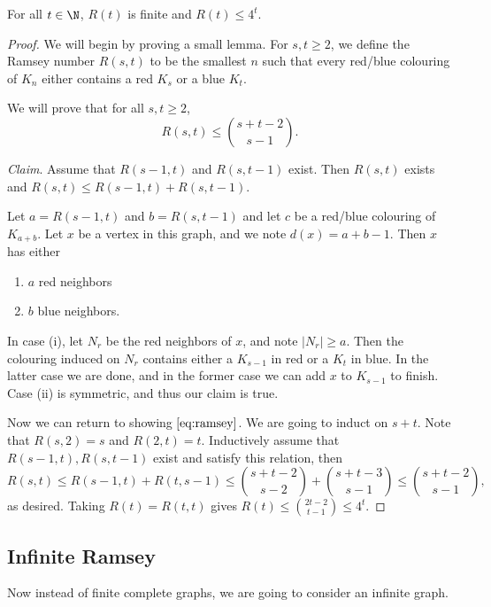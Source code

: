\documentclass[a4paper]{scrartcl}
\begin{document}
\begin{theorem}
	For all $t \in \N$, $R(t)$ is finite and $R(t) \leq 4^t$.
\end{theorem}
\begin{proof}
	We will begin by proving a small lemma. For $s, t \geq 2$, we define the Ramsey number $R(s, t)$ to be the smallest $n$ such that every red/blue colouring of $K_n$ either contains a red $K_s$ or a blue $K_t$.

	We will prove that for all $s, t \geq 2$,
	\begin{equation}\label{eq:ramsey}
		R(s, t) \leq \binom{s + t - 2}{s - 1}.\tag{$\dagger$}
	\end{equation}

	\emph{Claim}. Assume that $R(s - 1, t)$ and $R(s, t - 1)$ exist. Then $R(s, t)$ exists and $R(s, t) \leq R(s-1, t) + R(s, t - 1)$.

	Let $a = R(s - 1, t)$ and $b = R(s, t - 1)$ and let $c$ be a red/blue colouring of $K_{a + b}$. Let $x$ be a vertex in this graph, and we note $d(x) = a + b - 1$. Then $x$ has either
	\begin{enumerate}[label=(\roman*)]
		\item $a$ red neighbors
		\item $b$ blue neighbors.
	\end{enumerate}
	In case (i), let $N_r$ be the red neighbors of $x$, and note $|N_r| \geq a$. Then the colouring induced on $N_r$ contains either a $K_{s - 1}$ in red or a $K_{t}$ in blue. In the latter case we are done, and in the former case we can add $x$ to $K_{s - 1}$ to finish. Case (ii) is symmetric, and thus our claim is true.

	Now we can return to showing $\eqref{eq:ramsey}$. We are going to induct on $s + t$. Note that $R(s, 2) = s$ and $R(2, t) = t$. Inductively assume that $R(s - 1, t), R(s, t - 1)$ exist and satisfy this relation, then
	$$
	R(s, t) \leq R(s - 1, t) + R(t, s - 1) \leq \binom{s + t - 2}{s - 2} + \binom{s + t - 3}{s - 1} \leq \binom{s + t - 2}{s - 1},
	$$
	as desired. Taking $R(t) = R(t, t)$ gives $R(t) \leq \binom{2t - 2}{t - 1} \leq 4^t$.
\end{proof}

\subsection{Infinite Ramsey}

Now instead of finite complete graphs, we are going to consider an infinite graph.
\end{document}
